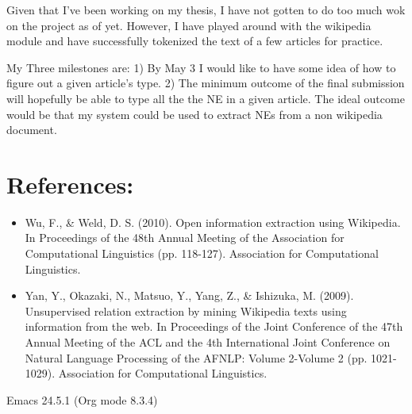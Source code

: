 \documentclass[11pt]{article}
\begin{document}
Given that I've been working on my thesis, I have not gotten to do too much wok on the project as of yet. However, I have played around with the wikipedia module and have successfully tokenized the text of a few articles for practice.

My Three milestones are: 1) By May 3 I would like to have some idea of how to figure out a given article's type. 2) The minimum outcome of the final submission will hopefully be able to type all the the NE in a given article. The ideal outcome would be that my system could be used to extract NEs from a non wikipedia document.


\section{References:}
\label{sec:orgheadline2}

\begin{itemize}
\item Wu, F., \& Weld, D. S. (2010). Open information extraction using Wikipedia. In Proceedings of the 48th Annual Meeting of the Association for Computational Linguistics (pp. 118-127). Association for Computational Linguistics.

\item Yan, Y., Okazaki, N., Matsuo, Y., Yang, Z., \& Ishizuka, M. (2009). Unsupervised relation extraction by mining Wikipedia texts using information from the web. In Proceedings of the Joint Conference of the 47th Annual Meeting of the ACL and the 4th International Joint Conference on Natural Language Processing of the AFNLP: Volume 2-Volume 2 (pp. 1021-1029). Association for Computational Linguistics.
\end{itemize}
Emacs 24.5.1 (Org mode 8.3.4)
\end{document}
